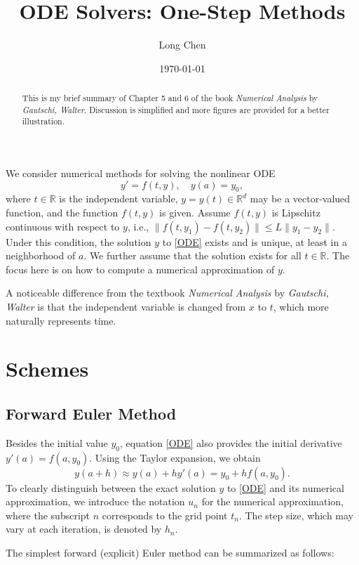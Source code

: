 \documentclass[10pt]{amsart}
\begin{document}
\title{ODE Solvers: One-Step Methods}
\author{Long Chen}\date{\today}
\begin{abstract}
This is my brief summary of Chapter 5 and 6 of the book {\em Numerical Analysis} by {\em Gautschi, Walter}. Discussion is simplified and more figures are provided for a better illustration. 
\end{abstract}
\maketitle

\tableofcontents

We consider numerical methods for solving the nonlinear ODE  
\begin{equation}\label{ODE}  
y' = f(t,y),\quad y(a) = y_0,  
\end{equation}  
where $t \in \mathbb{R}$ is the independent variable, $y = y(t) \in \mathbb{R}^d$ may be a vector-valued function, and the function $f(t, y)$ is given. Assume $f(t, y)$ is Lipschitz continuous with respect to $y$, i.e., $\|f(t, y_1) - f(t, y_2)\| \leq L\|y_1 - y_2\|$. Under this condition, the solution $y$ to \eqref{ODE} exists and is unique, at least in a neighborhood of $a$. We further assume that the solution exists for all $t \in \mathbb{R}$. The focus here is on how to compute a numerical approximation of $y$.  

A noticeable difference from the textbook {\em Numerical Analysis} by {\em Gautschi, Walter} is that the independent variable is changed from $x$ to $t$, which more naturally represents time.  


\section{Schemes}
\subsection{Forward Euler Method}  
Besides the initial value $y_0$, equation \eqref{ODE} also provides the initial derivative $y'(a) = f(a, y_0)$. Using the Taylor expansion, we obtain  
$$y(a+h) \approx y(a) + h y'(a) = y_0 + h f(a, y_0).$$  
To clearly distinguish between the exact solution $y$ to \eqref{ODE} and its numerical approximation, we introduce the notation $u_n$ for the numerical approximation, where the subscript $n$ corresponds to the grid point $t_n$. The step size, which may vary at each iteration, is denoted by $h_n$.  

The simplest forward (explicit) Euler method can be summarized as follows:  
\end{document}
